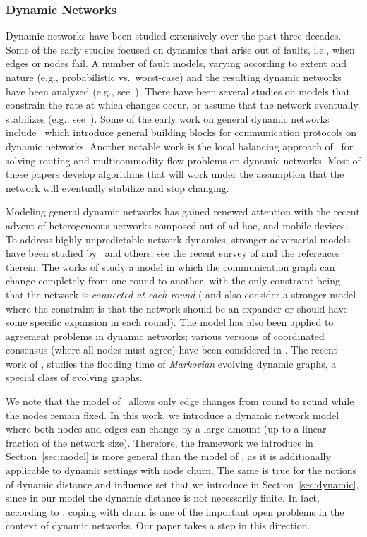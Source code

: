 \documentclass[leqno,11pt]{article}
\begin{document}
\subsubsection{Dynamic Networks}
Dynamic networks have been studied extensively over the past three
decades.  Some of the early studies focused on dynamics that arise out
of faults, i.e., when edges or nodes fail.  A number of fault models,
varying according to extent and nature (e.g., probabilistic
vs.\ worst-case) and the resulting dynamic networks have been analyzed
(e.g., see~\cite{AW04,Lyn96}).  There have
been several studies on models that constrain the rate at which
changes occur, or assume that the network eventually stabilizes (e.g.,
see~\cite{afek+ag:dynamic,dolev:stabilize,gafni+b:link-reversal}). 
Some of the early work on general dynamic networks
include~\cite{afek+gr:slide,awerbuch+pps:dynamic} which introduce
general building blocks for communication protocols on dynamic
networks.  Another notable work is the local
balancing approach of~\cite{awerbuch+l:flow} for solving routing and
multicommodity flow problems on dynamic networks.
Most of these papers develop algorithms that will work under the assumption that 
the network will eventually stabilize and stop changing.

Modeling general dynamic networks has gained renewed attention with
the recent advent of heterogeneous networks composed out of ad hoc,
and mobile devices. To address highly unpredictable network dynamics, stronger adversarial
models have been studied
by~\cite{avin+kl:dynamic,disc12,OW05,KOM11} and others;
see the recent survey of \cite{santoro} and the references therein. The works of  \cite{KOM11, avin+kl:dynamic, disc12} study a model
in which the communication graph can change completely from one round
to another, with the only constraint being that the network is
{\em connected at each round} (\cite{KOM11} and \cite{disc12} also consider a stronger model where the constraint is that
the network should be an expander or should have some specific expansion  in each round).
The model has also been applied to agreement problems in dynamic networks;
various versions of coordinated consensus (where all nodes must agree) have been
considered  in \cite{KOM11}. 
  The recent work of \cite{clementi-podc12},
studies the flooding time of {\em Markovian} evolving dynamic graphs,
a special class of evolving graphs.
 
We note that the model of~\cite{kuhn+lo:dynamic}
allows only edge changes from round to round while the nodes remain
fixed. In this work, we introduce a dynamic
network model  where both nodes and edges
can change by a large amount (up to a linear fraction of the network
size).  
Therefore, the framework we introduce in Section~\ref{sec:model} is more general
than the model of \cite{kuhn+lo:dynamic}, as it is additionally applicable to dynamic
settings with node churn.
The same is true for the notions of dynamic distance and influence
set that we introduce in Section~\ref{sec:dynamic}, since in our model the
dynamic distance is not necessarily finite. In fact, according to
\cite{kuhn-survey}, coping with churn is one of the important open problems in the
context of dynamic networks.  Our paper takes a step in this direction.
\end{document}
